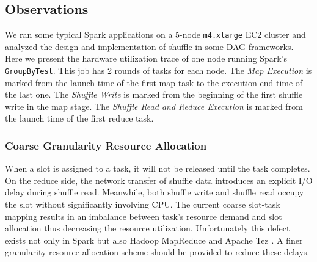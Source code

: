 \subsection{Observations} \label{observation}
We ran some typical Spark applications on a 5-node \texttt{m4.xlarge} EC2 cluster and analyzed the design and implementation of shuffle in some DAG frameworks.
Here we present the hardware utilization trace of one node running Spark's \texttt{GroupByTest}.
This job has 2 rounds of tasks for each node.
The \textit{Map Execution} is marked from the launch time of the first map task to the execution end time of the last one. 
The \textit{Shuffle Write} is marked from the beginning of the first shuffle write in the map stage. 
The \textit{Shuffle Read and Reduce Execution} is marked from the launch time of the first reduce task.
\subsubsection{Coarse Granularity Resource Allocation}
When a slot is assigned to a task, it will not be released until the task completes.
On the reduce side, the network transfer of shuffle data introduces an explicit I/O delay during shuffle read.
Meanwhile, both shuffle write and shuffle read occupy the slot without significantly involving CPU.
The current coarse slot-task mapping results in an imbalance between task's resource demand and slot allocation thus decreasing the resource utilization. 
Unfortunately this defect exists not only in Spark \cite{apachespark} but also Hadoop MapReduce and Apache Tez \cite{tez}. 
A finer granularity resource allocation scheme should be provided to reduce these delays. 

